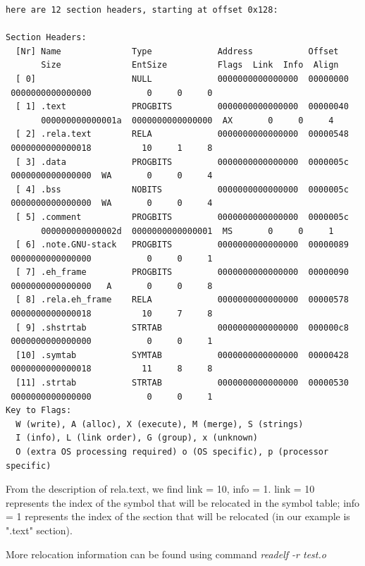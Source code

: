         \begin{lstlisting}[caption=Section header table of "test.o"]
here are 12 section headers, starting at offset 0x128: 

Section Headers: 
  [Nr] Name              Type             Address           Offset 
       Size              EntSize          Flags  Link  Info  Align 
  [ 0]                   NULL             0000000000000000  00000000 
 0000000000000000           0     0     0 
  [ 1] .text             PROGBITS         0000000000000000  00000040 
       000000000000001a  0000000000000000  AX       0     0     4 
  [ 2] .rela.text        RELA             0000000000000000  00000548 
 0000000000000018          10     1     8 
  [ 3] .data             PROGBITS         0000000000000000  0000005c 
 0000000000000000  WA       0     0     4 
  [ 4] .bss              NOBITS           0000000000000000  0000005c 
 0000000000000000  WA       0     0     4 
  [ 5] .comment          PROGBITS         0000000000000000  0000005c 
       000000000000002d  0000000000000001  MS       0     0     1 
  [ 6] .note.GNU-stack   PROGBITS         0000000000000000  00000089 
 0000000000000000           0     0     1 
  [ 7] .eh_frame         PROGBITS         0000000000000000  00000090 
 0000000000000000   A       0     0     8 
  [ 8] .rela.eh_frame    RELA             0000000000000000  00000578 
 0000000000000018          10     7     8 
  [ 9] .shstrtab         STRTAB           0000000000000000  000000c8 
 0000000000000000           0     0     1 
  [10] .symtab           SYMTAB           0000000000000000  00000428 
 0000000000000018          11     8     8 
  [11] .strtab           STRTAB           0000000000000000  00000530 
 0000000000000000           0     0     1 
Key to Flags: 
  W (write), A (alloc), X (execute), M (merge), S (strings) 
  I (info), L (link order), G (group), x (unknown) 
  O (extra OS processing required) o (OS specific), p (processor specific)
        \end{lstlisting}
        
       From the description of rela.text, we find link = 10, info = 1. link = 10 represents the index of the symbol that will be relocated in the symbol table; info = 1 represents the index of the section that will be relocated (in our example is ".text" section).\newline
       
       More relocation information can be found using command \textit{readelf -r test.o}
        
